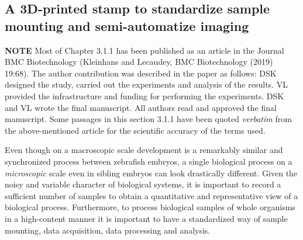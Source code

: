 \documentclass[10pt, b5paper, singlespacinge, twoside]{reedthesis} %
\theoremstyle{definition}
\theoremstyle{definition}
\theoremstyle{definition}
\theoremstyle{remark}
\begin{document}
\hypertarget{res-mount}{%
\subsection{A 3D-printed stamp to standardize sample mounting and semi-automatize imaging}\label{res-mount}}
\begin{tcolorbox}[colback = white, sharp corners = northwest]
\textbf{NOTE}
\tcblower
Most of Chapter 3.1.1 has been published as an article in the Journal BMC Biotechnology (Kleinhans and Lecaudey, BMC Biotechnology (2019) 19:68). The author contribution was described in the paper as follows: DSK designed the study, carried out the experiments and analysis of the results. VL provided the infrastructure and funding for performing the experiments. DSK and VL wrote the final manuscript. All authors read and approved the final manuscript. 
Some passages in this section 3.1.1 have been quoted \textit{verbatim} from the above-mentioned article for the scientific accuracy of the terms used.
\end{tcolorbox}
Even though on a macroscopic scale development is a remarkably similar and synchronized process between zebrafish embryos, a single biological process on a \emph{microscopic} scale even in sibling embryos can look drastically different. Given the noisy and variable character of biological systems, it is important to record a sufficient number of samples to obtain a quantitative and representative view of a biological process. Furthermore, to process biological samples of whole organisms in a high-content manner it is important to have a standardized way of sample mounting, data acquisition, data processing and analysis.
\end{document}
